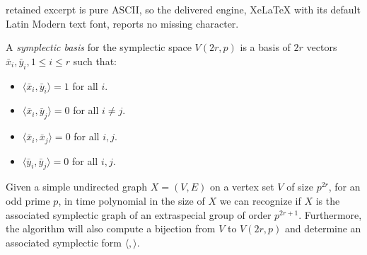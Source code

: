\documentclass[10pt,a4paper]{amsart}
\newcommand{\sympl}[1]{\langle #1 \rangle}
\begin{document}
retained excerpt is pure ASCII, so the delivered engine, XeLaTeX with its default Latin Modern text font, reports no missing character.
\begin{defn}\label{sympl-basis-def}
  A \emph{symplectic basis} for the symplectic space $V(2r,p)$ is a
  basis of $2r$ vectors $\bar{x}_i, \bar{y}_i, 1\le i\le r$ such
  that:
\begin{itemize}
\item $\sympl{\bar{x}_i,\bar{y}_i}=1$ for all $i$.
\item $\sympl{\bar{x}_i,\bar{y}_j}=0$ for all $i\ne j$.
\item $\sympl{\bar{x}_i,\bar{x}_j}=0$ for all $i,j$.
\item  $\sympl{\bar{y}_i,\bar{y}_j}=0$ for all $i,j$.
\end{itemize}
\end{defn}

\begin{theorem}\label{ortho-recog-thm}
  Given a simple undirected graph $X=(V,E)$ on a vertex set $V$ of
  size $p^{2r}$, for an odd prime $p$, in time polynomial in the size
  of $X$ we can recognize if $X$ is the associated symplectic graph of
  an extraspecial group of order $p^{2r+1}$. Furthermore, the
  algorithm will also compute a bijection from $V$ to $V(2r,p)$ and
  determine an associated symplectic form $\sympl{,}$.
\end{theorem}
\end{document}
